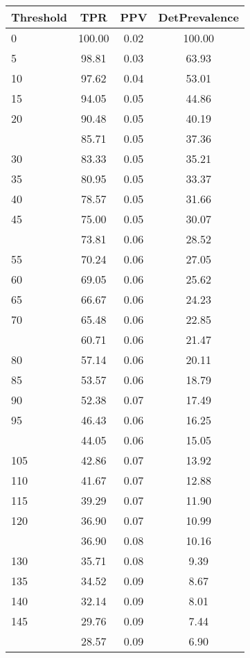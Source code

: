 \begin{table}[ht]
\centering
\begin{tabular}{lccc}
  \toprule
Threshold & TPR & PPV & DetPrevalence \\ 
  \midrule
0 & 100.00 & 0.02 & 100.00 \\ 
  5 & 98.81 & 0.03 & 63.93 \\ 
  10 & 97.62 & 0.04 & 53.01 \\ 
  15 & 94.05 & 0.05 & 44.86 \\ 
  20 & 90.48 & 0.05 & 40.19 \\ 
   \addlinespace
25 & 85.71 & 0.05 & 37.36 \\ 
  30 & 83.33 & 0.05 & 35.21 \\ 
  35 & 80.95 & 0.05 & 33.37 \\ 
  40 & 78.57 & 0.05 & 31.66 \\ 
  45 & 75.00 & 0.05 & 30.07 \\ 
   \addlinespace
50 & 73.81 & 0.06 & 28.52 \\ 
  55 & 70.24 & 0.06 & 27.05 \\ 
  60 & 69.05 & 0.06 & 25.62 \\ 
  65 & 66.67 & 0.06 & 24.23 \\ 
  70 & 65.48 & 0.06 & 22.85 \\ 
   \addlinespace
75 & 60.71 & 0.06 & 21.47 \\ 
  80 & 57.14 & 0.06 & 20.11 \\ 
  85 & 53.57 & 0.06 & 18.79 \\ 
  90 & 52.38 & 0.07 & 17.49 \\ 
  95 & 46.43 & 0.06 & 16.25 \\ 
   \addlinespace
100 & 44.05 & 0.06 & 15.05 \\ 
  105 & 42.86 & 0.07 & 13.92 \\ 
  110 & 41.67 & 0.07 & 12.88 \\ 
  115 & 39.29 & 0.07 & 11.90 \\ 
  120 & 36.90 & 0.07 & 10.99 \\ 
   \addlinespace
125 & 36.90 & 0.08 & 10.16 \\ 
  130 & 35.71 & 0.08 & 9.39 \\ 
  135 & 34.52 & 0.09 & 8.67 \\ 
  140 & 32.14 & 0.09 & 8.01 \\ 
  145 & 29.76 & 0.09 & 7.44 \\ 
   \addlinespace
150 & 28.57 & 0.09 & 6.90 \\ 

\end{tabular}
\end{table}
